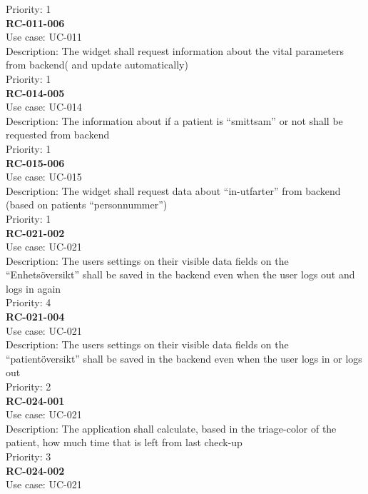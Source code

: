 Priority: 1 \\
\newline
\textbf{RC-011-006} \\
Use case: UC-011 \\
Description: The widget shall request information about the vital parameters from backend( and update automatically)  \\
Priority: 1 \\
\newline
\textbf{RC-014-005} \\
Use case: UC-014 \\
Description: The information about if a patient is “smittsam” or not shall be requested from backend \\
Priority: 1 \\
\newline
\textbf{RC-015-006} \\
Use case: UC-015 \\
Description: The widget shall request data about “in-utfarter” from backend  (based on patients “personnummer”)  \\
Priority: 1 \\
\newline
\textbf{RC-021-002} \\
Use case: UC-021 \\
Description: The users settings on their visible data fields on the “Enhetsöversikt” shall be saved in the backend even when the user logs out and logs in again  \\
Priority: 4 \\
\newline
\textbf{RC-021-004} \\
Use case: UC-021 \\
Description: The users settings on their visible data fields on the “patientöversikt” shall be saved in the backend even when the user logs in or logs out \\
Priority: 2 \\
\newline
\textbf{RC-024-001} \\
Use case: UC-021 \\
Description: The application shall calculate, based in the triage-color of the patient, how much time that is left from last check-up  \\
Priority: 3 \\
\newline
\textbf{RC-024-002} \\
Use case: UC-021 \\
